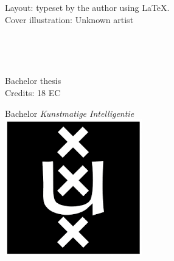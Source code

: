     \restoregeometry

\newpage


\vspace*{0.8\textheight}
\noindent
Layout: typeset by the author using \LaTeX. \\
Cover illustration: Unknown artist
\restoregeometry

\newpage

\begin{center}

\vspace{2.5cm}


\begin{Huge}
\theTitle
\end{Huge} \\

\vspace{0.5 cm}

\begin{Large}
\theSubTitle
\end{Large}

\vspace{1.5cm}

\theAuthor\\
\theStudentID

\vspace{1.5cm}

Bachelor thesis\\
Credits: 18 EC

\vspace{0.5cm}

Bachelor \textit{Kunstmatige Intelligentie} \\
\vspace{0.25cm}
\includegraphics[width=0.075\paperwidth]{fig/uva_logo} \\
\vspace{0.1cm}


\end{center}
